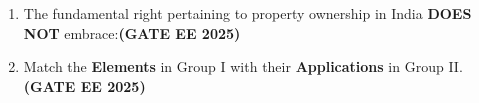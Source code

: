 \documentclass[journal,12pt,onecolumn]{IEEEtran}
\theoremstyle{remark}
\begin{document}
\begin{enumerate}
\begin{enumerate}
\end{enumerate}
\item The fundamental right pertaining to property ownership in India \textbf{DOES NOT} embrace:\hfill \textbf{(GATE EE 2025)}
\begin{enumerate}
\end{enumerate}

\item Match the \textbf{Elements} in Group I with their \textbf{Applications} in Group II. \hfill \textbf{(GATE EE 2025)}


\end{enumerate}
\end{document}
